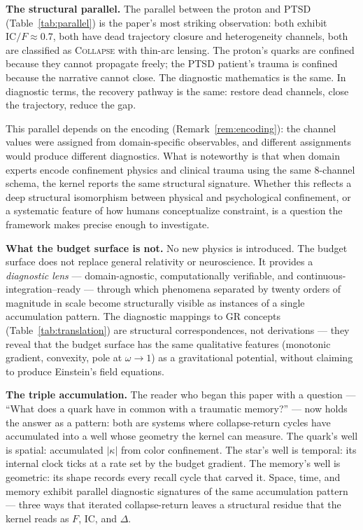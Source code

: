 \documentclass[
  aps,
  prd,
  twocolumn,
  superscriptaddress,
  nofootinbib,
  floatfix
]{revtex4-2}
\newcommand{\regime}[1]{\textrm{\upshape\scshape#1}}
\newcommand{\IC}{\mathrm{IC}}
\begin{document}
\textbf{The structural parallel.}
The parallel between the proton and PTSD
(Table~\ref{tab:parallel}) is the paper's most striking
observation: both exhibit $\IC/F \approx 0.7$, both have dead
trajectory closure and heterogeneity channels, both are
classified as \regime{Collapse} with thin-arc lensing.  The
proton's quarks are confined because they cannot propagate
freely; the PTSD patient's trauma is confined because the
narrative cannot close.  The diagnostic mathematics is the
same.  In diagnostic terms, the recovery pathway is the
same: restore dead channels, close the trajectory, reduce
the gap.

This parallel depends on the encoding
(Remark~\ref{rem:encoding}): the channel values were
assigned from domain-specific observables, and different
assignments would produce different diagnostics.  What is
noteworthy is that when domain experts encode confinement
physics and clinical trauma using the same 8-channel schema,
the kernel reports the same structural signature.  Whether
this reflects a deep structural isomorphism between physical
and psychological confinement, or a systematic feature of how
humans conceptualize constraint, is a question the framework
makes precise enough to investigate.

\textbf{What the budget surface is not.}
No new physics is introduced.  The budget surface does not
replace general relativity or neuroscience.  It provides a
\emph{diagnostic lens} --- domain-agnostic, computationally
verifiable, and continuous-integration--ready --- through which
phenomena separated by twenty orders of magnitude in scale
become structurally visible as instances of a single
accumulation pattern.  The diagnostic mappings to GR concepts
(Table~\ref{tab:translation}) are structural correspondences,
not derivations --- they reveal that the budget surface has
the same qualitative features (monotonic gradient,
convexity, pole at $\omega \to 1$) as a gravitational
potential, without claiming to produce Einstein's field
equations.

\textbf{The triple accumulation.}
The reader who began this paper with a question --- ``What
does a quark have in common with a traumatic memory?'' ---
now holds the answer as a pattern: both are systems where
collapse-return cycles have accumulated into a well whose
geometry the kernel can measure.  The quark's well is
spatial: accumulated $|\kappa|$ from color confinement.  The
star's well is temporal: its internal clock ticks at a rate
set by the budget gradient.  The memory's well is geometric:
its shape records every recall cycle that carved it.  Space,
time, and memory exhibit parallel diagnostic signatures of
the same accumulation pattern --- three ways that iterated
collapse-return leaves a structural residue that the kernel
reads as $F$, $\IC$, and $\Delta$.
\end{document}
